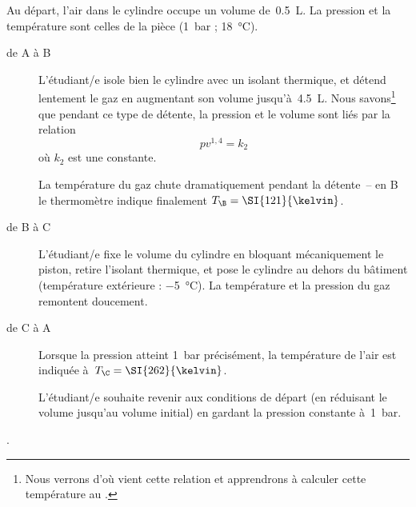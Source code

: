 	Au départ, l’air dans le cylindre occupe un volume de~\SI{0,5}{\liter}. La pression et la température sont celles de la pièce (\SI{1}{bar} ; \SI{18}{\degreeCelsius}).

	\begin{description}
		\item[de A à B] L’étudiant/e isole bien le cylindre avec un isolant thermique, et détend lentement le gaz en augmentant son volume jusqu’à~\SI{4,5}{\liter}. Nous savons\footnote{Nous verrons d’où vient cette relation et apprendrons à calculer cette température au \coursquatre.} que pendant ce type de détente, la pression et le volume sont liés par la relation 
			\begin{equation*}
				p v^{1,4} = k_2
			\end{equation*}
			 où $k_2$ est une constante. 
		
			La température du gaz chute dramatiquement pendant la détente\ – en B le thermomètre indique finalement $T_\B = \SI{121}{\kelvin}$. 
		
		\item[de B à C]	L’étudiant/e fixe le volume du cylindre en bloquant mécaniquement le piston, retire l’isolant thermique, et pose le cylindre au dehors du bâtiment (température extérieure : \SI{-5}{\degreeCelsius}). La température et la pression du gaz remontent doucement.

		\item[de C à A] Lorsque la pression atteint \SI{1}{\bar} précisément, la température de l’air est indiquée à~$T_\C = \SI{262}{\kelvin}$. 	
					
			L’étudiant/e souhaite revenir aux conditions de départ (en réduisant le volume jusqu’au volume initial) en gardant la pression constante à~\SI{1}{\bar}.
	\end{description}.
	
